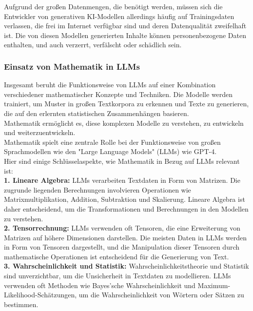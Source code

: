 \documentclass[12pt]{article}
\begin{document}
Aufgrund der großen Datenmengen, die benötigt werden, müssen sich die Entwickler von
generativen KI-Modellen allerdings häufig auf Trainingsdaten verlassen, die frei im Internet verfügbar sind und deren Datenqualität zweifelhaft ist. Die von diesen Modellen generierten Inhalte können personenbezogene Daten enthalten, und auch verzerrt, verfälscht oder schädlich sein. \\
%
\subsubsection{Einsatz von Mathematik in LLMs}
Insgesamt beruht die Funktionsweise von LLMs auf einer Kombination verschiedener mathematischer Konzepte und Techniken. Die Modelle werden trainiert, um Muster in großen Textkorpora zu erkennen und Texte zu generieren, die auf den erlernten statistischen Zusammenhängen basieren. \\ Mathematik ermöglicht es, diese komplexen Modelle zu verstehen, zu entwickeln und weiterzuentwickeln. \\
Mathematik spielt eine zentrale Rolle bei der Funktionsweise von großen Sprachmodellen wie den "Large Language Models" (LLMs) wie GPT-4. \\
Hier sind einige Schlüsselaspekte, wie Mathematik in Bezug auf LLMs relevant ist:\\

\textbf{1. Lineare Algebra:} LLMs verarbeiten Textdaten in Form von Matrizen. Die zugrunde liegenden Berechnungen involvieren Operationen wie Matrixmultiplikation, Addition, Subtraktion und Skalierung. Lineare Algebra ist daher entscheidend, um die Transformationen und Berechnungen in den Modellen zu verstehen.\\

\textbf{2. Tensorrechnung:} LLMs verwenden oft Tensoren, die eine Erweiterung von Matrizen auf höhere Dimensionen darstellen. Die meisten Daten in LLMs werden in Form von Tensoren dargestellt, und die Manipulation dieser Tensoren durch mathematische Operationen ist entscheidend für die Generierung von Text.\\

\textbf{3. Wahrscheinlichkeit und Statistik:} Wahrscheinlichkeitstheorie und Statistik sind unverzichtbar, um die Unsicherheit in Textdaten zu modellieren. LLMs verwenden oft Methoden wie Bayes'sche Wahrscheinlichkeit und Maximum-Likelihood-Schätzungen, um die Wahrscheinlichkeit von Wörtern oder Sätzen zu bestimmen.\\
\end{document}
